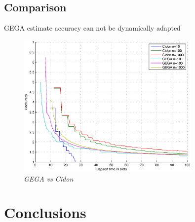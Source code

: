 \documentclass[11pt,a4paper,twoside,openright]{book}
\begin{document}
\section{Comparison}
GEGA estimate accuracy can not be dynamically adapted 

\begin{figure}[htbp]
\centering

\end{figure}

\begin{figure}[htbp]
\centering
    \includegraphics[width=0.8\textwidth]{matlab/Comparison/comparison-gega-cidon}%
 \caption{\emph{GEGA vs Cidon}}
\end{figure}


\chapter*{Conclusions}
\end{document}
